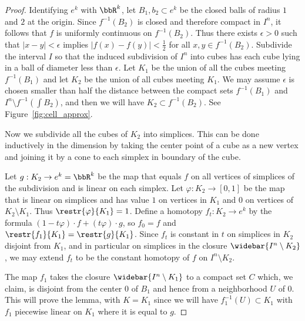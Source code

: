 \begin{proof}
    Identifying $e^k$ with $\bbR^k$, let $B_1,b_2\subset e^k$ be the closed balls of radius $1$ and $2$ at the origin. Since $f^{-1}(B_2)$ is closed and therefore compact in $I^n$, it follows that $f$ is uniformly continuous on $f^{-1}(B_2)$. Thus there exists $\epsilon>0$ such that $|x-y|<\epsilon$ implies $|f(x)-f(y)|<\frac 12$ for all $x,y\in f^{-1}(B_2)$. Subdivide the interval $I$ so that the induced subdivision of $I^n$ into cubes has each cube lying in a ball of diameter less than $\epsilon$. Let $K_1$ be the union of all the cubes meeting $f^{-1}(B_1)$ and let $K_2$ be the union of all cubes meeting $K_1$. We may assume $\epsilon$ is chosen smaller than half the distance between the compact sets $f^{-1}(B_1)$ and $I^n\setminus f^{-1}(\int B_2)$, and then we will have $K_2\subset f^{-1}(B_2)$. See Figure~\ref{fig:cell_approx}.

    Now we subdivide all the cubes of $K_2$ into simplices. This can be done inductively in the dimension by taking the center point of a cube as a new vertex and joining it by a cone to each simplex in boundary of the cube. 

    Let $g:K_2\to e^k=\bbR^k$ be the map that equals $f$ on all vertices of simplices of the subdivision and is linear on each simplex. Let $\varphi:K_2\to [0,1]$ be the map that is linear on simplices and has value $1$ on vertices in $K_1$ and $0$ on vertices of $K_2\setminus K_1$. Thus $\restr{\varphi}{K_1}=1$. Define a homotopy $f_t:K_2\to e^k$ by the formula $(1-t\varphi)\cdot f+(t\varphi)\cdot g$, so $f_0=f$ and $\restr{f_1}{K_1}=\restr{g}{K_1}$. Since $f_t$ is constant in $t$ on simplices in $K_2$ disjoint from $K_1$, and in particular on simplices in the closure $\widebar{I^n\setminus K_2}$, we may extend $f_t$ to be the constant homotopy of $f$ on $I^n\setminus K_2$.

    The map $f_1$ takes the closure $\widebar{I^n\setminus K_1}$ to a compact set $C$ which, we claim, is disjoint from the center $0$ of $B_1$ and hence from a neighborhood $U$ of $0$. This will prove the lemma, with $K=K_1$ since we will have $f_1^{-1}(U)\subset K_1$ with $f_1$ piecewise linear on $K_1$ where it is equal to $g$.


\end{proof}
